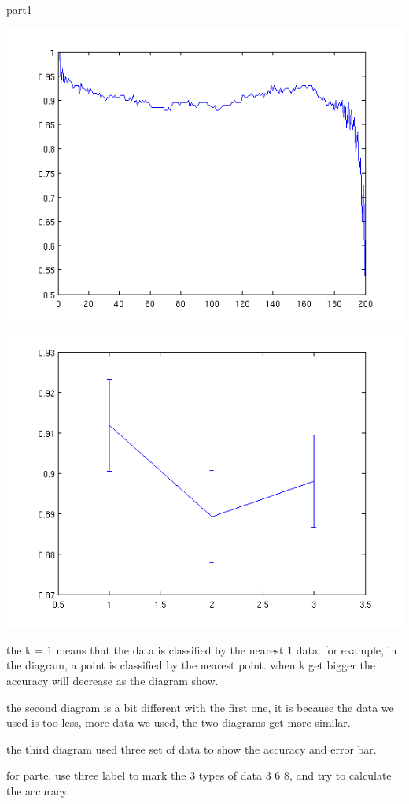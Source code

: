 \documentclass[a4paper]{article}
\begin{document}
part1

\includegraphics[scale=0.2]{1}
\includegraphics[scale=0.2]{2}

the k = 1 means that the data is classified by the nearest 1 data.
for example, in the diagram, a point is classified by the nearest point.
when k get bigger the accuracy will decrease as the diagram show.

the second diagram is a bit different with the first one, it is because the
data we used is too less, more data we used, the two diagrams get more similar.

the third diagram used three set of data to show the accuracy and error bar.

for parte, use three label to mark the 3 types of data 3 6 8, and try to
calculate the accuracy.
\end{document}
